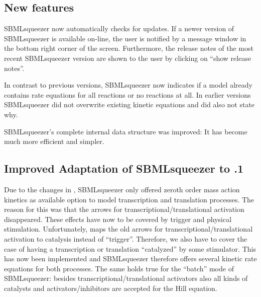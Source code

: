 \subsection{New features}

SBMLsqueezer now automatically checks for updates. If a newer version of
SBMLsqueezer is available on-line, the user is notified by a message window in
the bottom right corner of the screen. Furthermore, the release notes of the
most recent SBMLsqueezer version are shown to the user by clicking on ``show
release notes''.

In contrast to previous versions, SBMLsqueezer now indicates if a model already
contains rate equations for all reactions or no reactions at all. In earlier
versions SBMLsqueezer did not overwrite existing kinetic equations and did also
not state why.

SBMLsqueezer's complete internal data structure was improved: It has become much
more efficient and simpler.

\subsection{Improved Adaptation of SBMLsqueezer to .1}

Due to the changes in \CellDesigner, SBMLsqueezer only offered zeroth order mass
action kinetics as available option to model transcription and translation
processes. The reason for this was that the arrows for
transcriptional/translational activation disappeared. These effects have now to
be covered by trigger and physical stimulation. Unfortunately, \CellDesigner maps
the old arrows for transcriptional/translational activation to catalysis instead
of ``trigger''. Therefore, we also have to cover the case of having a
transcription or translation ``catalyzed'' by some stimulator. This has now been
implemented and SBMLsqueezer therefore offers several kinetic rate equations for
both processes. The same holds true for the ``batch'' mode of SBMLsqueezer:
besides transcriptional/translational activators also all kinds of catalysts and
activators/inhibitors are accepted for the Hill equation.

